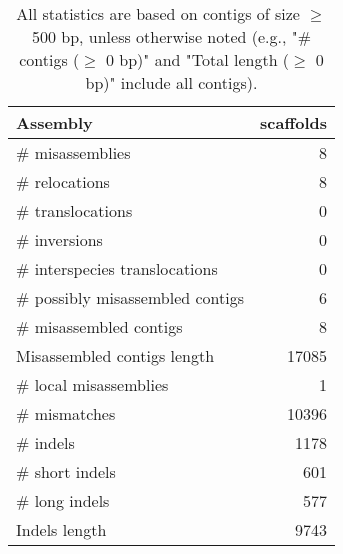 \documentclass[12pt,a4paper]{article}
\begin{document}
\begin{table}[ht]
\begin{center}
\caption{All statistics are based on contigs of size $\geq$ 500 bp, unless otherwise noted (e.g., "\# contigs ($\geq$ 0 bp)" and "Total length ($\geq$ 0 bp)" include all contigs).}
\begin{tabular}{|l*{1}{|r}|}
\hline
Assembly & scaffolds \\ \hline
\# misassemblies & 8 \\ \hline
\hspace{5mm}\# relocations & 8 \\ \hline
\hspace{5mm}\# translocations & 0 \\ \hline
\hspace{5mm}\# inversions & 0 \\ \hline
\hspace{5mm}\# interspecies translocations & 0 \\ \hline
\# possibly misassembled contigs & 6 \\ \hline
\# misassembled contigs & 8 \\ \hline
Misassembled contigs length & 17085 \\ \hline
\# local misassemblies & 1 \\ \hline
\# mismatches & 10396 \\ \hline
\# indels & 1178 \\ \hline
\hspace{5mm}\# short indels & 601 \\ \hline
\hspace{5mm}\# long indels & 577 \\ \hline
Indels length & 9743 \\ \hline
\end{tabular}
\end{center}
\end{table}
\end{document}
